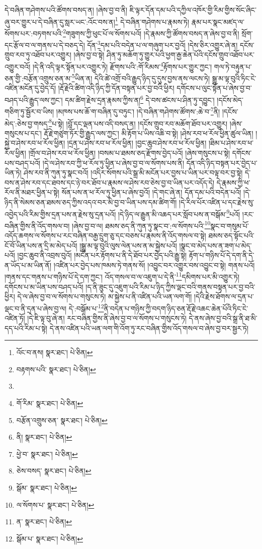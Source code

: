 དེ་བཞིན་གཤེགས་པའི་ཚོགས་བསད་ན། །ཞེས་བྱ་བ་ནི། ཇི་ལྟར་དོན་དམ་པའི་དཀྱིལ་འཁོར་གྱི་རིམ་གྱིས་སོང་ཞིང་ཞུ་བར་གྱུར་པ་དེ་བཞིན་དུ་སླར་ཡང་:འོང་བས་ན།\footnote{འོང་བ་ནས།  སྣར་ཐང་།  པེ་ཅིན། } དེ་བཞིན་གཤེགས་པ་རྣམས་ཏེ། རྣམ་པར་སྣང་མཛད་ལ་སོགས་པར་:བཏགས་པའི་\footnote{བརྟགས་པའི་  སྣར་ཐང་།  པེ་ཅིན། }གཟུགས་ཀྱི་ཕུང་པོ་ལ་སོགས་པའོ། །དེ་རྣམས་ཀྱི་ཚོགས་བསད་ན་ཞེས་བྱ་བ་ནི། སྲོག་དང་རྩོལ་བ་ལ་གནས་པ་དེ་བཅད་དེ། དོན་\footnote{}དམ་པའི་བདེན་པ་ལ་གཞུག་པར་བྱའོ། །དེས་ཅིར་འགྱུར་ཞེ་ན། དངོས་གྲུབ་རབ་ཏུ་འཐོབ་པར་འགྱུར། །ཞེས་བྱ་བ་སྟེ། ཤིན་ཏུ་མཆོག་ཏུ་གྱུར་པའི་ཕྱག་རྒྱ་ཆེན་པོའི་དངོས་གྲུབ་འཐོབ་པར་འགྱུར་བའོ། །དེ་ནི་འདི་ལྟར་སྟོན་པར་འགྱུར་ཏེ། རྫོགས་པའི་:གོ་རིམས་\footnote{གོ་རིམ་  སྣར་ཐང་།  པེ་ཅིན། }རྟོགས་པར་གྱུར་ཀྱང་། གལ་ཏེ་བརྟུན་པ་ཅན་གྱི་:བརྩོན་འགྲུས་ཅན་མ་\footnote{བརྩོན་འགྲུས་ཅན་  སྣར་ཐང་།  པེ་ཅིན། }ཡིན་ན། དེའི་ཚེ་འགྲོ་བའི་རྒྱུད་ཉིད་དུ་དུས་བྱས་ནས་ལངས་ཏེ། སྒྱུ་མ་ལྟ་བུའི་ཏིང་ངེ་འཛིན་མངོན་དུ་བྱེད་དོ། །རྡོ་རྗེའི་ཚིག་འདི་ཉིད་ཀྱི་དོན་བསྟན་པར་བྱ་བའི་ཕྱིར། དགོངས་པ་ལུང་སྟོན་པ་ཞེས་བྱ་བ་བཤད་པའི་རྒྱུད་ལས་ཀྱང་། དམ་ཚིག་རྗེས་དྲན་རྣམས་ཀྱིས་ན།\footnote{ནི།  སྣར་ཐང་།  པེ་ཅིན། } དེ་བས་ཚངས་པ་ཤིན་ཏུ་དབྱུང་། །དངོས་མེད་གཅིག་ཏུ་སྦྱོར་བ་ཡིས། །མཁས་པས་ཆོ་ག་བཞིན་དུ་བཏུང་། །དེ་བཞིན་གཤེགས་ཚོགས་:ཆེ་བ་\footnote{ཕྱེ་བ་  སྣར་ཐང་།  པེ་ཅིན། }ནི། །དངོས་མེད་:ཅེས་བྱ་གསད་\footnote{ཅེས་བསད་  སྣར་ཐང་།  པེ་ཅིན། }པ་སྟེ། །བློ་དང་ལྡན་པས་འདི་བསད་ན། །དངོས་གྲུབ་རབ་མཆོག་ཐོབ་པར་འགྱུར། །ཞེས་གསུངས་པ་དང་། རྡོ་རྗེ་གཙུག་ཏོར་གྱི་རྒྱུད་ལས་ཀྱང་། མི་རྟོག་པ་ཡིས་འཆི་བ་སྟེ། །ཤེས་རབ་ཕ་རོལ་ཕྱིན་ཚུལ་ཡིན། །སྐྱེ་བ་ཤེས་རབ་ཕ་རོལ་ཕྱིན། །དྲན་པ་ཤེས་རབ་ཕ་རོལ་ཕྱིན། །བྱང་ཆུབ་ཤེས་རབ་ཕ་རོལ་ཕྱིན། །ཐིམ་པ་ཤེས་རབ་ཕ་རོལ་ཕྱིན། །གྲོལ་བ་ཤེས་རབ་ཕ་རོལ་ཕྱིན། །བསམ་པ་ཐམས་ཅད་རྫོགས་བྱེད་པའོ། །ཞེས་གསུངས་པ་སྟེ། དགོངས་པས་བཤད་པའོ། །དེ་ལ་ཤེས་རབ་ཀྱི་ཕ་རོལ་ཏུ་ཕྱིན་པ་ཞེས་བྱ་བ་ལ་སོགས་པས་ནི། དོན་འདི་ཉིད་བསྟན་པར་བྱེད་པ་ཡིན་ཏེ། ཤེས་རབ་ནི་ཀུན་ཏུ་སྣང་བའོ། །འདིར་སོགས་པའི་སྒྲ་མི་མངོན་པར་བྱས་པ་ཡིན་པར་བལྟ་བར་བྱ་སྟེ། དེ་བས་ན་ཤེས་རབ་དང་ཐབས་དང་ཉེ་བར་ཐོབ་པ་རྣམས་ལ་ཤེས་རབ་ཅེས་བྱ་བ་ཡིན་པར་འདོད་དེ། དེ་རྣམས་ཀྱི་ཕ་རོལ་ནི་མཐར་ཕྱིན་པ་སྟེ། སོན་པས་ན་ཕ་རོལ་ཏུ་ཕྱིན་པ་ཞེས་བྱའོ། །དེ་གང་ཞེ་ན། དོན་དམ་པའི་བདེན་པའོ། །དེ་ཉིད་ནི་སེམས་ཅན་ཐམས་ཅད་ཀྱིས་འདའ་བར་མི་བྱ་བ་ཡིན་པས་དམ་ཚིག་གོ། །དེ་རིལ་པོར་འཛིན་པ་དང་རྗེས་སུ་འབྱེད་པའི་རིམ་གྱིས་དྲན་པས་ན་རྗེས་སུ་དྲན་པའོ། །དེ་ཉིད་ལ་རྒྱུན་མི་འཆད་པར་སློབ་པས་ན་བསྒོམ་\footnote{སྒོམ་  སྣར་ཐང་།  པེ་ཅིན། }པའོ། །རང་བཞིན་གྱིས་ནི་འོད་གསལ་བ། །ཞེས་བྱ་བ་ལ། ཐམས་ཅད་ནི་ཀུན་ཏུ་སྣང་བ་:ལ་སོགས་པའི་\footnote{ལ་སོགས་པ་  སྣར་ཐང་།  པེ་ཅིན། }སྣང་བ་གསུམ་པོ་འདོད་ཆགས་ལ་སོགས་པ་རང་བཞིན་བརྒྱ་དྲུག་ཅུ་དང་བཅས་པ་རྣམས་ནི་འོད་གསལ་བ་སྟེ། ཐམས་ཅད་སྟོང་པའི་ངོ་བོ་ཡིན་པས་ན་དྲི་མ་མེད་པའོ། །སྒྱུ་མ་ལྟ་བུའི་ལུས་ལེན་པས་ན་མ་སྐྱེས་པའོ། །སྣང་བ་མེད་པས་ན་ཟག་པ་མེད་པའོ། །བྱང་ཆུབ་ནི་འབྲས་བུའོ། །མངོན་པར་རྟོགས་པ་ནི་དེ་ཐོབ་པར་བྱེད་པའི་རྒྱུ་སྟེ། རྟོག་པ་གཉིས་པོ་དེ་དག་ནི་དེ་ན་ཡོད་པ་མ་ཡིན་ནོ། །འཛིན་པར་བྱེད་པས་ཁམས་ཏེ་གནས་སོ། །འབྱུང་བར་འགྱུར་བས་འབྱུང་བ་སྟེ། གནས་པའོ། །གནས་དང་གནས་པ་གཉིས་པོ་དེ་དག་ཀྱང་། འོད་གསལ་བ་ལ་འཇུག་པ་དེ་ནི་\footnote{ན་  སྣར་ཐང་།  པེ་ཅིན། }དམིགས་པར་མི་འགྱུར་ཏེ། དགོངས་པ་མ་ཡིན་པས་བཤད་པའོ། །ད་ནི་ཟུང་དུ་འཇུག་པའི་རིམ་པ་ཉིད་ཀྱིས་ལྡང་བའི་གནས་བསྟན་པར་བྱ་བའི་ཕྱིར། དེ་ལ་ཞེས་བྱ་བ་ལ་སོགས་པ་གསུངས་ཏེ། མ་སྐྱེས་པ་ནི་འཛིན་པའི་ཡན་ལག་གོ། །དེའི་རྗེས་ཐོགས་ལ་དྲན་པ་ལྡང་བ་ནི་དྲན་པ་ཞེས་བྱ་ལ། དེ་:བསྒོམ་པ་\footnote{སྒོམ་པ་  སྣར་ཐང་།  པེ་ཅིན། }ནི་བདེན་པ་གཉིས་ཀྱི་བདག་ཉིད་ཅན་རྡོ་རྗེ་འཆང་ཆེན་པོའི་ཏིང་ངེ་འཛིན་ཏོ། །དེ་ཇི་ལྟ་བུ་ཞེ་ན། རང་བཞིན་གྱིས་ནི་ཞེས་བྱ་བ་ལ་སོགས་པ་གསུངས་ཏེ། དེ་ནས་ཞེས་བྱ་བའི་སྒྲ་ནི་ཐ་མི་དད་པའི་རིམ་པ་སྟེ། དེ་ནས་འཛིན་པའི་ཡན་ལག་གི་འོག་ཏུ་རང་བཞིན་གྱིས་འོད་གསལ་བ་ཞེས་བྱ་བར་སྦྱར་ཏེ། 
